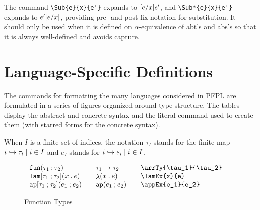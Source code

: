 \documentclass[11pt]{article}
\begin{document}
The command \verb|\Sub{e}{x}{e'}| expands to $\Sub{e}{x}{e'}$, and \verb|\Sub*{e}{x}{e'}| expands to $\Sub*{e}{x}{e'}$, providing pre- and post-fix notation for substitution.  It should only be used when it is defined on $\alpha$-equivalence of abt's and abs's so that it is always well-defined and avoids capture.

\section*{Language-Specific Definitions}

The commands for formatting the many languages considered in \textsf{PFPL} are formulated in a series of figures organized around type structure.  The tables display the abstract and concrete syntax and the literal command used to create them (with starred forms for the concrete syntax).

When $I$ is a finite set of indices, the notation $\tau_I$ stands for the finite map $\finmap{I}{i}{\tau}$ and $e_I$ stands for $\finmap{I}{i}{e}$.

\clearpage
{}

\begin{figure}
  \begin{small}
    \begin{displaymath}
      \begin{array}{l@{\qquad}l@{\qquad}l@{\qquad}l}
        \arrTy{\tau_1}{\tau_2} & \arrTy*{\tau_1}{\tau_2} & \verb|\arrTy{\tau_1}{\tau_2}| \\
        \lamEx{x}{e}           & \lamEx*{x}{e}           & \verb|\lamEx{x}{e}|           \\
        \appEx{e_1}{e_2}       & \appEx*{e_1}{e_2}       & \verb|\appEx{e_1}{e_2}|
      \end{array}
    \end{displaymath}
  \end{small}

  \caption{Function Types}
  \label{fig:function}
\end{figure}
\end{document}
